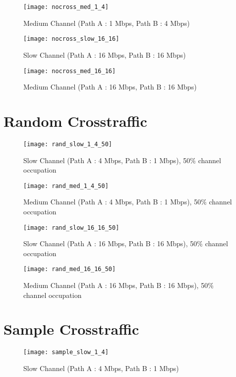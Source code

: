 \begin{figure}[!ht]
\caption{Medium Channel (Path A : 1 Mbps, Path B : 4 Mbps)}
\centering
\texttt{[image: nocross\_med\_1\_4]}
\end{figure}



\begin{figure}[!ht]
\caption{Slow Channel (Path A : 16 Mbps, Path B : 16 Mbps)}
\centering
\texttt{[image: nocross\_slow\_16\_16]}
\end{figure}

\begin{figure}[!ht]
\caption{Medium Channel (Path A : 16 Mbps, Path B : 16 Mbps)}
\centering
\texttt{[image: nocross\_med\_16\_16]}
\end{figure}


\section{Random Crosstraffic}

\begin{figure}[!ht]
\caption{Slow Channel (Path A : 4 Mbps, Path B : 1 Mbps), 50\% channel occupation}
\centering
\texttt{[image: rand\_slow\_1\_4\_50]}
\end{figure}

\begin{figure}[!ht]
\caption{Medium Channel (Path A : 4 Mbps, Path B : 1 Mbps), 50\% channel occupation}
\centering
\texttt{[image: rand\_med\_1\_4\_50]}
\end{figure}

\begin{figure}[!ht]
\caption{Slow Channel (Path A : 16 Mbps, Path B : 16 Mbps), 50\% channel occupation}
\centering
\texttt{[image: rand\_slow\_16\_16\_50]}
\end{figure}

\begin{figure}[!ht]
\caption{Medium Channel (Path A : 16 Mbps, Path B : 16 Mbps), 50\% channel occupation}
\centering
\texttt{[image: rand\_med\_16\_16\_50]}
\end{figure}

\section{Sample Crosstraffic}

\begin{figure}[!ht]
\caption{Slow Channel (Path A : 4 Mbps, Path B : 1 Mbps)}
\centering
\texttt{[image: sample\_slow\_1\_4]}
\end{figure}

